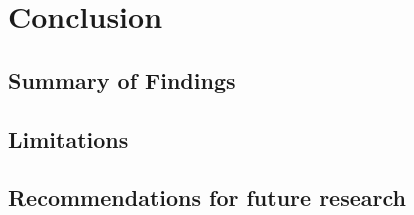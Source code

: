 \section{Conclusion}

 
 \subsection{Summary of Findings}
 
 \subsection{Limitations}
 
 \subsection{Recommendations for future research}